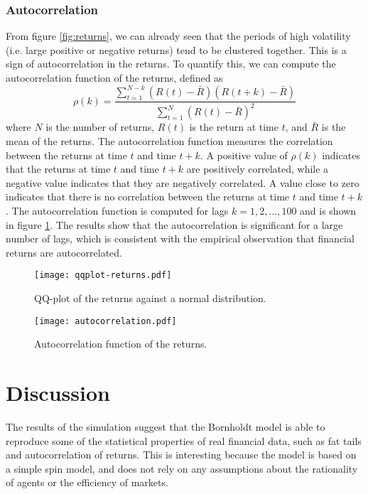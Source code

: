 \subsubsection{Autocorrelation}
From figure \ref{fig:returns}, we can already seen that the periods of high volatility (i.e. large positive or negative returns) tend to be clustered together. This is a sign of autocorrelation in the returns. To quantify this, we can compute the autocorrelation function of the returns, defined as
\begin{equation}
    \rho(k) = \frac{\sum_{t=1}^{N-k} (R(t) - \bar{R})(R(t+k) - \bar{R})}{\sum_{t=1}^{N} (R(t) - \bar{R})^2}
\end{equation}
where $N$ is the number of returns, $R(t)$ is the return at time $t$, and $\bar{R}$ is the mean of the returns. The autocorrelation function measures the correlation between the returns at time $t$ and time $t+k$. A positive value of $\rho(k)$ indicates that the returns at time $t$ and time $t+k$ are positively correlated, while a negative value indicates that they are negatively correlated. A value close to zero indicates that there is no correlation between the returns at time $t$ and time $t+k$.
The autocorrelation function is computed for lags $k=1,2,\ldots,100$ and is shown in figure \ref{fig:autocorrelation}. The results show that the autocorrelation is significant for a large number of lags, which is consistent with the empirical observation that financial returns are autocorrelated.

\begin{figure}[H]
    \centering
    \begin{minipage}[T]{0.45\textwidth}
        \centering
        \texttt{[image: qqplot-returns.pdf]}
        \caption{QQ-plot of the returns against a normal distribution.}
        \label{fig:qqplot}
    \end{minipage}
    \hfill
    \begin{minipage}[T]{0.45\textwidth}
        \centering
        \texttt{[image: autocorrelation.pdf]}
        \caption{Autocorrelation function of the returns.}
        \label{fig:autocorrelation}
    \end{minipage}
\end{figure}


\section{Discussion}
The results of the simulation suggest that the Bornholdt model is able to reproduce some of the statistical properties of real financial data, such as fat tails and autocorrelation of returns. This is interesting because the model is based on a simple spin model, and does not rely on any assumptions about the rationality of agents or the efficiency of markets.

